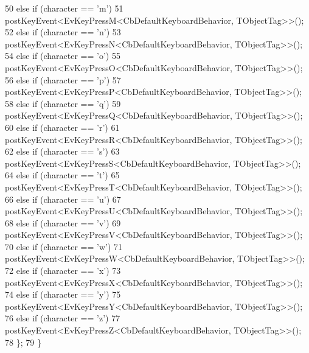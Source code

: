 \begin{DoxyCode}
50             \textcolor{keywordflow}{else} \textcolor{keywordflow}{if} (character == \textcolor{charliteral}{'m'})
51                 postKeyEvent<EvKeyPressM<CbDefaultKeyboardBehavior, TObjectTag>>();
52             \textcolor{keywordflow}{else} \textcolor{keywordflow}{if} (character == \textcolor{charliteral}{'n'})
53                 postKeyEvent<EvKeyPressN<CbDefaultKeyboardBehavior, TObjectTag>>();
54             \textcolor{keywordflow}{else} \textcolor{keywordflow}{if} (character == \textcolor{charliteral}{'o'})
55                 postKeyEvent<EvKeyPressO<CbDefaultKeyboardBehavior, TObjectTag>>();
56             \textcolor{keywordflow}{else} \textcolor{keywordflow}{if} (character == \textcolor{charliteral}{'p'})
57                 postKeyEvent<EvKeyPressP<CbDefaultKeyboardBehavior, TObjectTag>>();
58             \textcolor{keywordflow}{else} \textcolor{keywordflow}{if} (character == \textcolor{charliteral}{'q'})
59                 postKeyEvent<EvKeyPressQ<CbDefaultKeyboardBehavior, TObjectTag>>();
60             \textcolor{keywordflow}{else} \textcolor{keywordflow}{if} (character == \textcolor{charliteral}{'r'})
61                 postKeyEvent<EvKeyPressR<CbDefaultKeyboardBehavior, TObjectTag>>();
62             \textcolor{keywordflow}{else} \textcolor{keywordflow}{if} (character == \textcolor{charliteral}{'s'})
63                 postKeyEvent<EvKeyPressS<CbDefaultKeyboardBehavior, TObjectTag>>();
64             \textcolor{keywordflow}{else} \textcolor{keywordflow}{if} (character == \textcolor{charliteral}{'t'})
65                 postKeyEvent<EvKeyPressT<CbDefaultKeyboardBehavior, TObjectTag>>();
66             \textcolor{keywordflow}{else} \textcolor{keywordflow}{if} (character == \textcolor{charliteral}{'u'})
67                 postKeyEvent<EvKeyPressU<CbDefaultKeyboardBehavior, TObjectTag>>();
68             \textcolor{keywordflow}{else} \textcolor{keywordflow}{if} (character == \textcolor{charliteral}{'v'})
69                 postKeyEvent<EvKeyPressV<CbDefaultKeyboardBehavior, TObjectTag>>();
70             \textcolor{keywordflow}{else} \textcolor{keywordflow}{if} (character == \textcolor{charliteral}{'w'})
71                 postKeyEvent<EvKeyPressW<CbDefaultKeyboardBehavior, TObjectTag>>();
72             \textcolor{keywordflow}{else} \textcolor{keywordflow}{if} (character == \textcolor{charliteral}{'x'})
73                 postKeyEvent<EvKeyPressX<CbDefaultKeyboardBehavior, TObjectTag>>();
74             \textcolor{keywordflow}{else} \textcolor{keywordflow}{if} (character == \textcolor{charliteral}{'y'})
75                 postKeyEvent<EvKeyPressY<CbDefaultKeyboardBehavior, TObjectTag>>();
76             \textcolor{keywordflow}{else} \textcolor{keywordflow}{if} (character == \textcolor{charliteral}{'z'})
77                 postKeyEvent<EvKeyPressZ<CbDefaultKeyboardBehavior, TObjectTag>>();
78         \};
79     \}
\end{DoxyCode}
